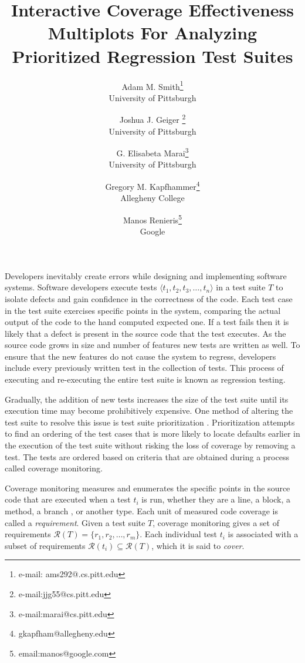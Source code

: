 \documentclass{vgtc}                          %
\title{Interactive Coverage Effectiveness Multiplots For Analyzing \\ Prioritized Regression Test Suites }
\author{Adam M. Smith\thanks{e-mail: ams292@.cs.pitt.edu}\\ %
  \scriptsize University of Pittsburgh %
\and Joshua J. Geiger \thanks{e-mail:jjg55@cs.pitt.edu}\\ %
     \scriptsize University of Pittsburgh %
\and G. Elisabeta Marai\thanks{e-mail:marai@cs.pitt.edu}\\ %
     \scriptsize University of Pittsburgh %
 \and Gregory M. Kapfhammer\thanks{gkapfham@allegheny.edu} \\ %
     \scriptsize Allegheny College%
  \and Manos Renieris\thanks{email:manos@google.com} \\
     \scriptsize Google}
\begin{document}


\maketitle


Developers inevitably create errors while designing and implementing software systems. Software developers execute tests $\langle t_1, t_2, t_3,\ldots, t_n\rangle$ in a test suite $T$ to isolate defects and gain confidence in the correctness of the code.  Each test case in the test suite exercises specific points in the system, comparing the actual output of the code to the hand computed expected one.  If a test fails then it is likely that a defect is present in the source code that the test executes.  As the source code grows in size and number of features new tests are written as well.  To ensure that the new features do not cause the system to regress, developers include every previously written test in the collection of tests.  This process of executing and re-executing the entire test suite is known as regression testing.  

Gradually, the addition of new tests increases the size of the test suite until its execution time may become prohibitively expensive.  One method of altering the test suite to resolve this issue is test suite prioritization \cite{rothermelprioritizing2001}.  Prioritization attempts to find an ordering of the test cases that is more likely to locate defaults earlier in the execution of the test suite without risking the loss of coverage by removing a test.  The tests are ordered based on criteria that are obtained during a process called coverage monitoring.  

Coverage monitoring measures and enumerates the specific points in the source code that are executed when a test $t_i$ is run, whether they are a line, a block, a method, a branch \cite{zhu}, or another type.  Each unit of measured code coverage is called a \textit{requirement}.  Given a test suite $T$, coverage monitoring gives a set of requirements $\mathcal{R}(T) = \{ r_1, r_2,\ldots,r_m \}$.  Each individual test $t_i$ is associated with a subset of requirements $\mathcal{R}(t_i) \subseteq \mathcal{R}(T)$, which it is said to \textit{cover}.  
\end{document}
